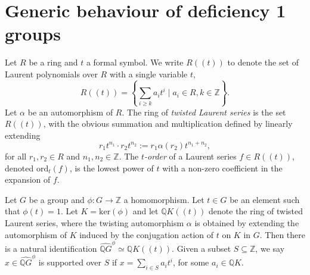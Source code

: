 \section{Generic behaviour of deficiency 1 groups}

Let $R$ be a ring and $t$ a formal symbol. We write $R(\!(t)\!)$ to denote the set of Laurent polynomials over $R$ with a single variable $t$,
\[R(\!( t )\!) = \left\{ \sum_{i \geq k} a_it^{i} \mid a_i \in R, k \in \mathbb{Z}\right\}. \]
Let $\alpha$ be an automorphism of $R$. The ring of \emph{twisted Laurent series} is the set $R(\!(t)\!)$, with the obvious summation and multiplication defined by linearly extending 
\[r_1t^{n_1} \cdot r_2t^{n_2} := r_1 \alpha(r_2) t^{n_1 + n_2},\] for all $r_1, r_2 \in R$ and $n_1, n_2 \in \mathbb{Z}$. The \emph{$t$-order} of a Laurent series $f \in R(\!(t)\!)$, denoted $\mathrm{ord}_t(f)$, is the lowest power of $t$ with a non-zero coefficient in the expansion of $f$.

Let $G$ be a group and $\phi \colon G \to \mathbb{Z}$ a homomorphism. Let $t \in G$ be an element such that $\phi(t) = 1$. Let $K = \mathrm{ker}(\phi)$ and let $\mathbb{Q}K (\!(t)\!)$ denote the ring of twisted Laurent series, where the twisting automorphism $\alpha$ is obtained by extending the automorphism of $K$ induced by the conjugation action of $t$ on $K$ in $G$. Then there is a natural identification $\widehat{\mathbb{Q}G}^{\phi} \simeq \mathbb{Q}K(\!(t)\!)$. Given a subset $S \subseteq \mathbb{Z}$, we say $x \in \widehat{\mathbb{Q}G}^{\phi}$ is supported over $S$ if $x = \sum_{i \in S}a_it^{i}$, for some $a_i \in \mathbb{Q}K$.

